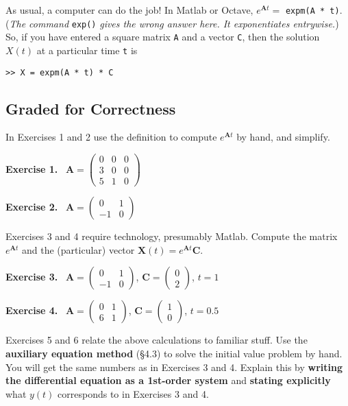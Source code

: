 \documentclass[12pt]{article}
\theoremstyle{definition}
\newcommand{\bA}{\mathbf{A}}
\newcommand{\bC}{\mathbf{C}}
\newcommand{\bX}{\mathbf{X}}
\newcommand{\exer}[1]{\noindent \textbf{Exercise #1.} \,}
\newcommand{\ds}{\displaystyle}
\begin{document}
As usual, a computer can do the job!  In Matlab or Octave, $e^{\bA t}=$ \verb|expm(A * t)|.  (\emph{The command} \texttt{exp()} \emph{gives the wrong answer here.  It exponentiates entrywise.})  So, if you have entered a square matrix \texttt{A} and a vector \texttt{C}, then the solution $X(t)$ at a particular time \texttt{t} is
\begin{Verbatim}
>> X = expm(A * t) * C
\end{Verbatim}


\clearpage\newpage
\normalsize
\subsection*{Graded for Correctness}

In Exercises 1 and 2 use the definition to compute $e^{\bA t}$ by hand, and simplify.

\exer{1}  $\ds \bA = \begin{pmatrix} 0 & 0 & 0 \\ 3 & 0 & 0 \\ 5 & 1 & 0 \end{pmatrix}$

\exer{2}  $\ds \bA = \begin{pmatrix} 0 & 1 \\ -1 & 0 \end{pmatrix}$

\medskip
Exercises 3 and 4 require technology, presumably Matlab.  Compute the matrix $e^{\bA t}$ and the (particular) vector $\bX(t) = e^{\bA t} \bC$.

\exer{3}  $\ds \bA = \begin{pmatrix} 0 & 1 \\ -1 & 0 \end{pmatrix}$, $\ds \bC = \begin{pmatrix} 0 \\ 2 \end{pmatrix}$, $t=1$

\exer{4}  $\ds \bA = \begin{pmatrix} 0 & 1 \\ 6 & 1 \end{pmatrix}$, $\ds \bC = \begin{pmatrix} 1 \\0 \end{pmatrix}$, $t=0.5$

\medskip
Exercises 5 and 6 relate the above calculations to familiar stuff.  Use the \textbf{auxiliary equation method} (\S4.3) to solve the initial value problem by hand.  You will get the same numbers as in Exercises 3 and 4.  Explain this by \textbf{writing the differential equation as a 1st-order system} and \textbf{stating explicitly} what $y(t)$ corresponds to in Exercises 3 and 4.
\end{document}

